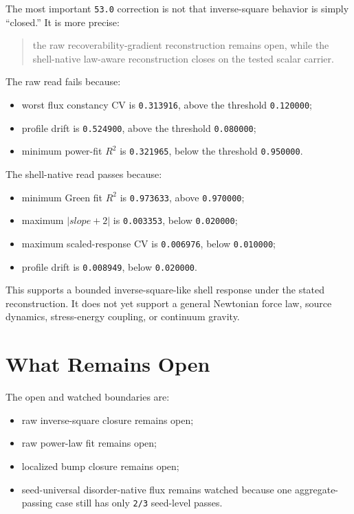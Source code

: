 \documentclass[11pt]{article}
\begin{document}
The most important \texttt{53.0} correction is not that inverse-square behavior is simply ``closed.'' It is more precise:
\begin{quote}
the raw recoverability-gradient reconstruction remains open, while the shell-native law-aware reconstruction closes on the tested scalar carrier.
\end{quote}

The raw read fails because:
\begin{itemize}
\item worst flux constancy CV is \texttt{0.313916}, above the threshold \texttt{0.120000};
\item profile drift is \texttt{0.524900}, above the threshold \texttt{0.080000};
\item minimum power-fit \(R^2\) is \texttt{0.321965}, below the threshold \texttt{0.950000}.
\end{itemize}

The shell-native read passes because:
\begin{itemize}
\item minimum Green fit \(R^2\) is \texttt{0.973633}, above \texttt{0.970000};
\item maximum \(|slope+2|\) is \texttt{0.003353}, below \texttt{0.020000};
\item maximum scaled-response CV is \texttt{0.006976}, below \texttt{0.010000};
\item profile drift is \texttt{0.008949}, below \texttt{0.020000}.
\end{itemize}

This supports a bounded inverse-square-like shell response under the stated reconstruction. It does not yet support a general Newtonian force law, source dynamics, stress-energy coupling, or continuum gravity.

\section{What Remains Open}

The open and watched boundaries are:
\begin{itemize}
\item raw inverse-square closure remains open;
\item raw power-law fit remains open;
\item localized bump closure remains open;
\item seed-universal disorder-native flux remains watched because one aggregate-passing case still has only \texttt{2/3} seed-level passes.
\end{itemize}
\end{document}
